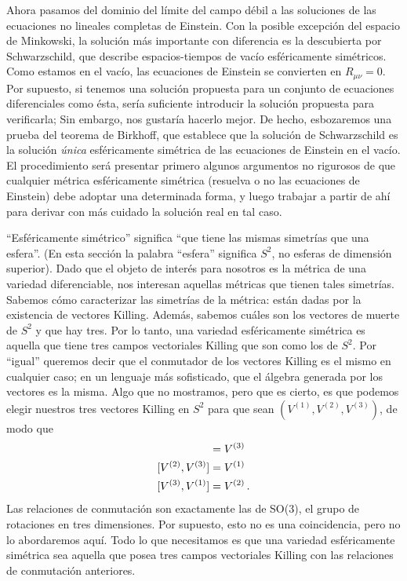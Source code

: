 \documentclass[11pt,b5paper,openany,twoside]{book}
\newcommand{\mn}{{\mu\nu}}
\begin{document}
Ahora pasamos del dominio del límite del campo débil a las soluciones de las ecuaciones no lineales completas de Einstein.
Con la posible excepción del espacio de Minkowski, la solución más importante con diferencia es la descubierta por Schwarzschild, que describe espacios-tiempos de vacío esféricamente simétricos.
Como estamos en el vacío, las ecuaciones de Einstein se convierten en $R_\mn =0$.
Por supuesto, si tenemos una solución propuesta para un conjunto de ecuaciones diferenciales como ésta, sería suficiente introducir la solución propuesta para verificarla; Sin embargo, nos gustaría hacerlo mejor.
De hecho, esbozaremos una prueba del teorema de Birkhoff, que establece que la solución de Schwarzschild es la solución {\it única} esféricamente simétrica de las ecuaciones de Einstein en el vacío.
El procedimiento será presentar primero algunos argumentos no rigurosos de que cualquier métrica esféricamente simétrica (resuelva o no las ecuaciones de Einstein) debe adoptar una determinada forma, y luego trabajar a partir de ahí para derivar con más cuidado la solución real en tal caso.

``Esféricamente simétrico'' significa ``que tiene las mismas simetrías que una esfera''. (En esta sección la palabra ``esfera'' significa $S^2$, no esferas de dimensión superior).
Dado que el objeto de interés para nosotros es la métrica de una variedad diferenciable, nos interesan aquellas métricas que tienen tales simetrías.
Sabemos cómo caracterizar las simetrías de la métrica: están dadas por la existencia de vectores Killing.
Además, sabemos cuáles son los vectores de muerte de $S^2$ y que hay tres.
Por lo tanto, una variedad esféricamente simétrica es aquella que tiene tres campos vectoriales Killing que son como los de $S^2$.
Por ``igual'' queremos decir que el conmutador de los vectores Killing es el mismo en cualquier caso; en un lenguaje más sofisticado, que el álgebra generada por los vectores es la misma.
Algo que no mostramos, pero que es cierto, es que podemos elegir nuestros tres vectores Killing en $S^2$ para que sean $(V^{(1)},V^{(2)},V^{(3)})$, de modo que
\begin{align}
[V^{(1)},V^{(2)}] &= V^{(3)} \notag \\
[V^{(2)},V^{(3)}] &= V^{(1)} \notag \\
[V^{(3)},V^{(1)}] &= V^{(2)} \,. \label{7.1}
\end{align}
Las relaciones de conmutación son exactamente las de SO(3), el grupo de rotaciones en tres dimensiones.
Por supuesto, esto no es una coincidencia, pero no lo abordaremos aquí.
Todo lo que necesitamos es que una variedad esféricamente simétrica sea aquella que posea tres campos vectoriales Killing con las relaciones de conmutación anteriores.
\end{document}
